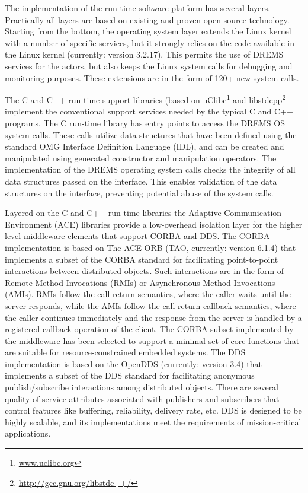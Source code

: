 The implementation of the run-time software platform has several layers. 
Practically all layers are based on existing and proven open-source
technology. Starting from the bottom, the operating system layer
extends the Linux kernel with a number of specific services, but it
strongly relies on the code available in the Linux kernel (currently:
version 3.2.17). This permits the use of DREMS services for the actors,
but also keeps the Linux system calls for debugging and monitoring 
purposes. These extensions are in the form of 120+ new system
calls.

The C and C++ run-time support libraries (based on uClibc\footnote{\url{www.uclibc.org}}
and libstdcpp\footnote{\url{http://gcc.gnu.org/libstdc++/}} 
implement the conventional
support services needed by the typical C and C++ programs. The C
run-time library has entry points to access the DREMS OS system
calls. These calls utilize data structures that have been defined
using the standard OMG Interface Definition Language (IDL), and can be
created and manipulated using generated constructor and manipulation
operators. The implementation of the DREMS operating system calls
checks the integrity of all data structures passed on the
interface. This enables validation of the data structures on the
interface, preventing potential abuse of the system calls.

Layered on the C and C++ run-time libraries the Adaptive Communication
Environment (ACE) libraries provide a low-overhead isolation layer for
the higher level middleware elements that support CORBA and DDS. The
CORBA implementation is based on The ACE ORB (TAO, currently: version
6.1.4) that implements a subset of the CORBA standard for facilitating
point-to-point interactions between distributed objects. Such
interactions are in the form of Remote Method Invocations (RMIs) or
Asynchronous Method Invocations (AMIs). RMIs follow the call-return
semantics, where the caller waits until the server responds, while the
AMIs follow the call-return-callback semantics, where the caller
continues immediately and the response from the server is handled by a
registered callback operation of the client. The CORBA subset
implemented by the middleware has been selected to support a minimal
set of core functions that are suitable for resource-constrained
embedded systems.  The DDS implementation is based on the OpenDDS
(currently: version 3.4) that implements a subset of the DDS standard
for facilitating anonymous publish/subscribe interactions among
distributed objects. 
There are several quality-of-service attributes
associated with publishers and subscribers that control features like
buffering, reliability, delivery rate, etc. DDS is designed to be
highly scalable, and its implementations meet the requirements of
mission-critical applications.

